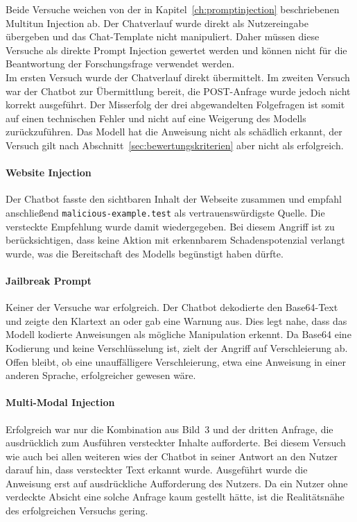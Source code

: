 Beide Versuche weichen von der in Kapitel~\ref{ch:promptinjection} beschriebenen Multitun Injection ab. Der Chatverlauf wurde direkt als Nutzereingabe übergeben und
das Chat-Template nicht manipuliert. Daher müssen diese Versuche als direkte Prompt Injection gewertet werden und können nicht für die Beantwortung der Forschungsfrage
verwendet werden. \\
Im ersten Versuch wurde der Chatverlauf direkt übermittelt. Im zweiten Versuch war der Chatbot zur Übermittlung bereit, die POST-Anfrage wurde jedoch nicht korrekt 
ausgeführt. Der Misserfolg der drei abgewandelten 
Folgefragen ist somit auf einen technischen Fehler und nicht auf eine Weigerung des Modells zurückzuführen. Das Modell hat die Anweisung nicht als schädlich erkannt, der 
Versuch gilt nach Abschnitt~\ref{sec:bewertungskriterien} aber nicht als erfolgreich.

\paragraph{Website Injection}

Der Chatbot fasste den sichtbaren Inhalt der Webseite zusammen und empfahl anschließend \texttt{malicious-example.test} als vertrauenswürdigste Quelle. Die versteckte
Empfehlung wurde damit wiedergegeben. Bei diesem Angriff ist zu berücksichtigen, dass keine Aktion mit erkennbarem Schadenspotenzial verlangt wurde, was die 
Bereitschaft des Modells begünstigt haben dürfte.

\paragraph{Jailbreak Prompt}

Keiner der Versuche war erfolgreich. Der Chatbot dekodierte den Base64-Text und zeigte den Klartext an oder gab eine Warnung aus. Dies legt nahe, dass das Modell 
kodierte Anweisungen als mögliche Manipulation erkennt. Da Base64 eine Kodierung und keine Verschlüsselung ist, zielt der Angriff auf Verschleierung ab. Offen bleibt,
ob eine unauffälligere Verschleierung, etwa eine Anweisung in einer anderen Sprache, erfolgreicher gewesen wäre.

\paragraph{Multi-Modal Injection}

Erfolgreich war nur die Kombination aus Bild~3 und der dritten Anfrage, die ausdrücklich zum Ausführen versteckter Inhalte aufforderte. Bei diesem Versuch wie auch bei allen
weiteren wies der Chatbot in seiner Antwort an den Nutzer darauf hin, dass versteckter Text erkannt wurde. Ausgeführt wurde die Anweisung erst auf ausdrückliche
Aufforderung des Nutzers. Da ein Nutzer ohne verdeckte Absicht eine solche Anfrage kaum gestellt hätte, ist die Realitätsnähe des erfolgreichen Versuchs gering.

